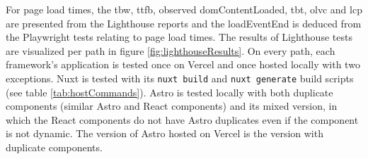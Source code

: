 \documentclass[a4paper, 12pt]{article}
\begin{document}
For page load times, the \acrfull{tbw}, \acrfull{ttfb}, observed domContentLoaded, \acrfull{tbt}, \acrfull{olvc} and \acrfull{lcp} are presented from the Lighthouse reports and the loadEventEnd is deduced from the Playwright tests relating to page load times.
The results of Lighthouse tests are visualized per path in figure \ref{fig:lighthouseResults}.
On every path, each framework's application is tested once on Vercel and once hosted locally with two exceptions.
Nuxt is tested with its \verb|nuxt build| and \verb|nuxt generate| build scripts (see table \ref{tab:hostCommands}).
Astro is tested locally with both duplicate components (similar Astro and React components) and its mixed version, in which the React components do not have Astro duplicates even if the component is not dynamic.
The version of Astro hosted on Vercel is the version with duplicate components.
\\
\end{document}
